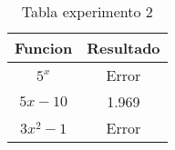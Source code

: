 \begin{table}[!h]
\begin{center}
\begin{tabular}{|c|c|}\hline
{\bf Funcion} & {\bf Resultado}\\ \hline
$5^x$ & Error\\%
$5x-10$ & 1.969\\
$3x^2-1$ & Error\\%
\hline
\end{tabular}
\end{center}
\caption{Tabla experimento 2}
\label{Mitabla2}
\end{table}
